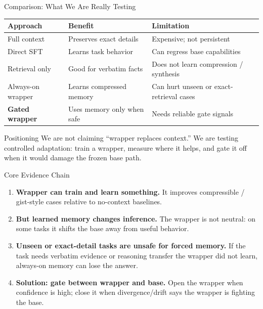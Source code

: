 \begin{frame}{Comparison: What We Are Really Testing}
  \small
  \begin{tabular}{p{}p{}p{}}
    \toprule
    Approach & Benefit & Limitation \\
    \midrule
    Full context & Preserves exact details & Expensive; not persistent \\
    Direct SFT & Learns task behavior & Can regress base capabilities \\
    Retrieval only & Good for verbatim facts & Does not learn compression / synthesis \\
    Always-on wrapper & Learns compressed memory & Can hurt unseen or exact-retrieval cases \\
    \textbf{Gated wrapper} & Uses memory only when safe & Needs reliable gate signals \\
    \bottomrule
  \end{tabular}

  \vspace{0.7em}
  \begin{block}{Positioning}
    We are not claiming ``wrapper replaces context.'' We are testing controlled
    adaptation: train a wrapper, measure where it helps, and gate it off when it
    would damage the frozen base path.
  \end{block}
\end{frame}

\begin{frame}{Core Evidence Chain}
  \begin{enumerate}
    \item \textbf{Wrapper can train and learn something.}
      It improves compressible / gist-style cases relative to no-context
      baselines.
    \item \textbf{But learned memory changes inference.}
      The wrapper is not neutral: on some tasks it shifts the base away from
      useful behavior.
    \item \textbf{Unseen or exact-detail tasks are unsafe for forced memory.}
      If the task needs verbatim evidence or reasoning transfer the wrapper did
      not learn, always-on memory can lose the answer.
    \item \textbf{Solution: gate between wrapper and base.}
      Open the wrapper when confidence is high; close it when divergence/drift
      says the wrapper is fighting the base.
  \end{enumerate}
\end{frame}

